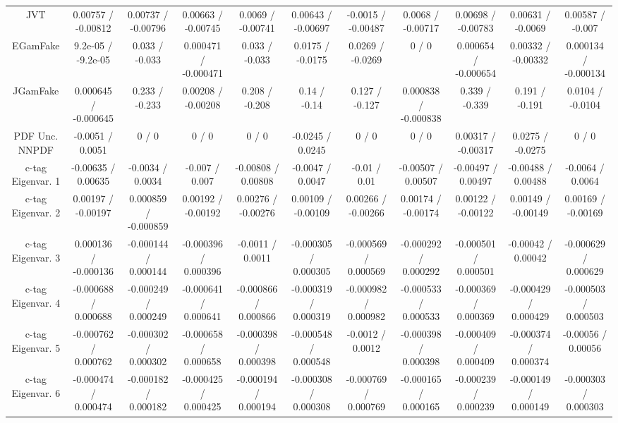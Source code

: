 \begin{table}[htbp]
\begin{center}
\begin{tabular}{|c|c|c|c|c|c|c|c|c|c|c|}
  JVT & 0.00757 / -0.00812 & 0.00737 / -0.00796 & 0.00663 / -0.00745 & 0.0069 / -0.00741 & 0.00643 / -0.00697 & -0.0015 / -0.00487 & 0.0068 / -0.00717 & 0.00698 / -0.00783 & 0.00631 / -0.0069 & 0.00587 / -0.007 \\ 
  EGamFake & 9.2e-05 / -9.2e-05 & 0.033 / -0.033 & 0.000471 / -0.000471 & 0.033 / -0.033 & 0.0175 / -0.0175 & 0.0269 / -0.0269 & 0 / 0 & 0.000654 / -0.000654 & 0.00332 / -0.00332 & 0.000134 / -0.000134 \\ 
  JGamFake & 0.000645 / -0.000645 & 0.233 / -0.233 & 0.00208 / -0.00208 & 0.208 / -0.208 & 0.14 / -0.14 & 0.127 / -0.127 & 0.000838 / -0.000838 & 0.339 / -0.339 & 0.191 / -0.191 & 0.0104 / -0.0104 \\ 
  PDF Unc. NNPDF & -0.0051 / 0.0051 & 0 / 0 & 0 / 0 & 0 / 0 & -0.0245 / 0.0245 & 0 / 0 & 0 / 0 & 0.00317 / -0.00317 & 0.0275 / -0.0275 & 0 / 0 \\ 
  c-tag Eigenvar. 1 & -0.00635 / 0.00635 & -0.0034 / 0.0034 & -0.007 / 0.007 & -0.00808 / 0.00808 & -0.0047 / 0.0047 & -0.01 / 0.01 & -0.00507 / 0.00507 & -0.00497 / 0.00497 & -0.00488 / 0.00488 & -0.0064 / 0.0064 \\ 
  c-tag Eigenvar. 2 & 0.00197 / -0.00197 & 0.000859 / -0.000859 & 0.00192 / -0.00192 & 0.00276 / -0.00276 & 0.00109 / -0.00109 & 0.00266 / -0.00266 & 0.00174 / -0.00174 & 0.00122 / -0.00122 & 0.00149 / -0.00149 & 0.00169 / -0.00169 \\ 
  c-tag Eigenvar. 3 & 0.000136 / -0.000136 & -0.000144 / 0.000144 & -0.000396 / 0.000396 & -0.0011 / 0.0011 & -0.000305 / 0.000305 & -0.000569 / 0.000569 & -0.000292 / 0.000292 & -0.000501 / 0.000501 & -0.00042 / 0.00042 & -0.000629 / 0.000629 \\ 
  c-tag Eigenvar. 4 & -0.000688 / 0.000688 & -0.000249 / 0.000249 & -0.000641 / 0.000641 & -0.000866 / 0.000866 & -0.000319 / 0.000319 & -0.000982 / 0.000982 & -0.000533 / 0.000533 & -0.000369 / 0.000369 & -0.000429 / 0.000429 & -0.000503 / 0.000503 \\ 
  c-tag Eigenvar. 5 & -0.000762 / 0.000762 & -0.000302 / 0.000302 & -0.000658 / 0.000658 & -0.000398 / 0.000398 & -0.000548 / 0.000548 & -0.0012 / 0.0012 & -0.000398 / 0.000398 & -0.000409 / 0.000409 & -0.000374 / 0.000374 & -0.00056 / 0.00056 \\ 
  c-tag Eigenvar. 6 & -0.000474 / 0.000474 & -0.000182 / 0.000182 & -0.000425 / 0.000425 & -0.000194 / 0.000194 & -0.000308 / 0.000308 & -0.000769 / 0.000769 & -0.000165 / 0.000165 & -0.000239 / 0.000239 & -0.000149 / 0.000149 & -0.000303 / 0.000303 \\ 

\end{tabular}
\end{center}
\end{table}
